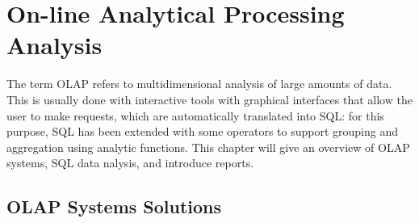 \chapter{On-line Analytical Processing Analysis}

The term OLAP refers to multidimensional analysis of large amounts of data. This is usually done with interactive tools with graphical interfaces that allow the user to make requests, which are automatically translated into SQL: for this purpose, SQL has been extended with some operators to support grouping and aggregation using analytic functions. This chapter will give an overview of OLAP systems, SQL data nalysis, and introduce reports.

\section{OLAP Systems Solutions}

